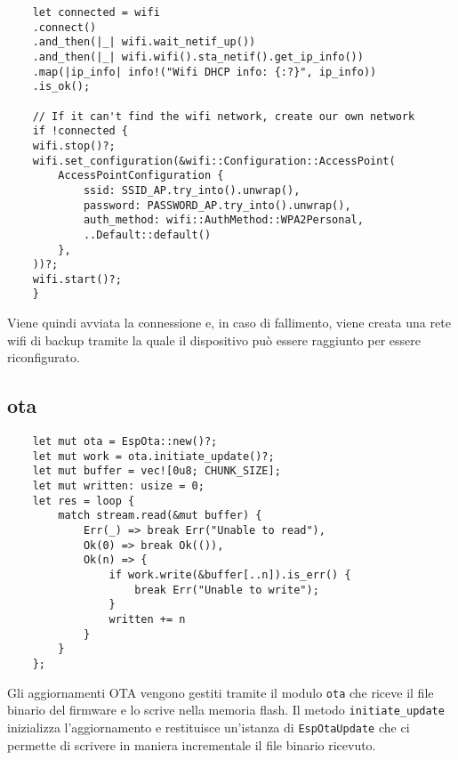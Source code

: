 \begin{listing}[H]
    \begin{verbatim}
    let connected = wifi
    .connect()
    .and_then(|_| wifi.wait_netif_up())
    .and_then(|_| wifi.wifi().sta_netif().get_ip_info())
    .map(|ip_info| info!("Wifi DHCP info: {:?}", ip_info))
    .is_ok();

    // If it can't find the wifi network, create our own network
    if !connected {
    wifi.stop()?;
    wifi.set_configuration(&wifi::Configuration::AccessPoint(
        AccessPointConfiguration {
            ssid: SSID_AP.try_into().unwrap(),
            password: PASSWORD_AP.try_into().unwrap(),
            auth_method: wifi::AuthMethod::WPA2Personal,
            ..Default::default()
        },
    ))?;
    wifi.start()?;
    }
    \end{verbatim}
\end{listing}

Viene quindi avviata la connessione e, in caso di fallimento, viene creata una rete wifi di backup tramite 
la quale il dispositivo può essere raggiunto per essere riconfigurato.

\subsection{ota}

\begin{listing}[H]
    \begin{verbatim}
    let mut ota = EspOta::new()?;
    let mut work = ota.initiate_update()?;
    let mut buffer = vec![0u8; CHUNK_SIZE];
    let mut written: usize = 0;
    let res = loop {
        match stream.read(&mut buffer) {
            Err(_) => break Err("Unable to read"),
            Ok(0) => break Ok(()),
            Ok(n) => {
                if work.write(&buffer[..n]).is_err() {
                    break Err("Unable to write");
                }
                written += n
            }
        }
    };
    \end{verbatim}
\end{listing}

Gli aggiornamenti OTA vengono gestiti tramite il modulo \texttt{ota} che riceve il file binario del firmware
e lo scrive nella memoria flash. Il metodo \texttt{initiate\_update} inizializza l'aggiornamento e restituisce un'istanza di \texttt{EspOtaUpdate}
che ci permette di scrivere in maniera incrementale il file binario ricevuto.

